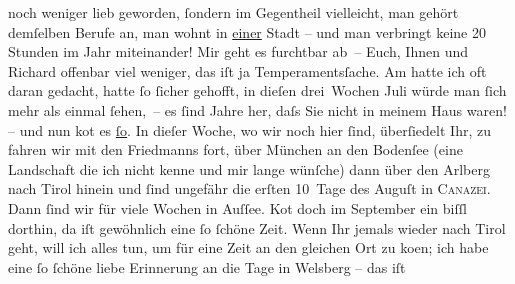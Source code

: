 \begin{ledgroupsized}[t]{13cm}
               noch weniger lieb geworden, {\pb}ſondern im Gegentheil vielleicht, man gehört demſelben Berufe an, man wohnt in \uline{einer} Stadt – und man verbringt keine 20 Stunden im
               Jahr miteinander! Mir geht es furchtbar ab – Euch, Ihnen und Richard offenbar viel weniger, das iſt ja Temperamentsſache. Am
                  \label{K_L01947_1v}\label{K_L01947_1h}{ }{\pb}hatte ich oft daran gedacht,
               hatte ſo ſicher gehofft, in dieſen drei Wochen Juli würde man ſich mehr
               als einmal ſehen, – es ſind Jahre her, daſs Sie nicht in meinem Haus waren! – und nun ko{\geminationm}t es \uline{ſo}. In dieſer
               Woche, wo wir noch hier ſind,  überſiedelt Ihr,
               zu \label{K_L01947_2v}\label{K_L01947_2h} fahren wir mit {\pb}den
                  Friedmanns fort, über München an den Bodenſee (eine
               Landschaft die ich nicht kenne und mir lange wünſche) dann über den Arlberg nach Tirol hinein und
               ſind ungefähr die erſten 10 Tage des Auguſt in \textsc{Canazei}. Dann ſind wir für viele Wochen {\pb}in Auſſee. Ko{\geminationm}t doch im September ein
               biſſl dorthin, da iſt gewöhnlich eine ſo ſchöne Zeit.\pend
           \pstart
           Wenn Ihr jemals wieder nach Tirol geht, will ich
               alles tun, um für eine Zeit an den gleichen Ort zu ko{\geminationm}en; ich habe {\pb}eine ſo ſchöne
               liebe Erinnerung an die Tage in Welsberg – das iſt

\end{ledgroupsized}
